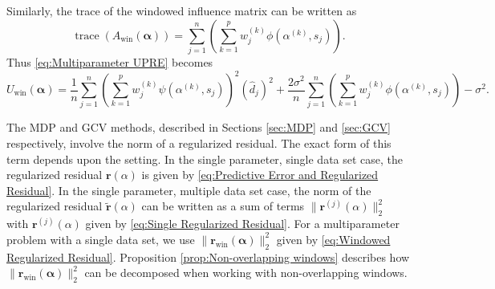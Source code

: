 \documentclass[12pt]{article}
\newcommand{\rVec}{\mathbf{r}}	%
\DeclareMathOperator{\trace}{trace}		%
\newcommand{\dft}[1]{\widehat{#1}}	%
\newcommand{\regparam}{\alpha}  %
\newcommand{\regparamVec}{\bm{\regparam}}   %
\newcommand{\filt}{\phi}
\newcommand{\mfilt}{\psi}
\newcommand{\noiseSD}{\sigma}	%
\newcommand{\singular}{s}	%
\begin{document}
Similarly, the trace of the windowed influence matrix can be written as
\begin{equation}
    \trace\left(A_\text{win}(\regparamVec)\right) = \sum_{j=1}^{n} \left(\sum_{k=1}^{p} w_j^{(k)} \filt\left(\regparam^{(k)},\singular_j\right) \right).
\end{equation}
Thus \eqref{eq:Multiparameter UPRE} becomes
\begin{equation}
\label{eq:Multiparameter UPRE 2}
    U_\text{win}(\regparamVec) = \frac{1}{n}\sum_{j=1}^{n} \left(\sum_{k=1}^{p} w_j^{(k)} \mfilt\left(\regparam^{(k)},\singular_j\right) \right)^2 \left(\dft{d}_j\right)^2 + \frac{2\noiseSD^2}{n}\sum_{j=1}^{n} \left(\sum_{k=1}^{p} w_j^{(k)} \filt\left(\regparam^{(k)},\singular_j\right) \right) - \noiseSD^2.
\end{equation}

The MDP and GCV methods, described in Sections \ref{sec:MDP} and \ref{sec:GCV} respectively, involve the norm of a regularized residual. The exact form of this term depends upon the setting. In the single parameter, single data set case, the regularized residual $\rVec(\regparam)$ is given by \eqref{eq:Predictive Error and Regularized Residual}. In the single parameter, multiple data set case, the norm of the regularized residual $\widetilde{\rVec}(\regparam)$ can be written as a sum of terms $\|\rVec^{(j)}(\regparam)\|_2^2$ with $\rVec^{(j)}(\regparam)$ given by \eqref{eq:Single Regularized Residual}. For a multiparameter problem with a single data set, we use $\|\rVec_{\text{win}}(\regparamVec)\|_2^2$ given by \eqref{eq:Windowed Regularized Residual}. Proposition \ref{prop:Non-overlapping windows} describes how $\|\rVec_{\text{win}}(\regparamVec)\|_2^2$ can be decomposed when working with non-overlapping windows.
\end{document}
